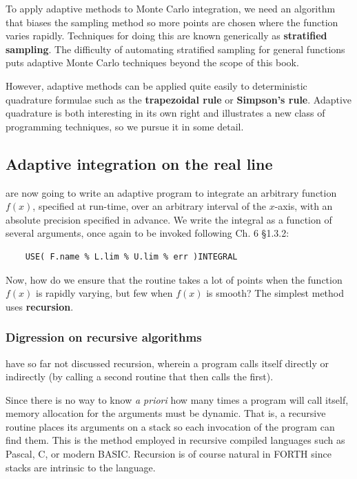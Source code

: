 To apply adaptive methods to Monte Carlo integration, we need an algorithm that biases the sampling method so more points are chosen where the function varies rapidly. Techniques for doing this are known generically as \textbf{stratified sampling}. The difficulty of automating stratified sampling for general functions puts adaptive Monte Carlo techniques beyond the scope of this book.

However, adaptive methods can be applied quite easily to deterministic quadrature formulae such as the \textbf{trapezoidal rule} or \textbf{Simpson’s rule}. Adaptive quadrature is both interesting in its own right and illustrates a new class of programming techniques, so we pursue it in some detail.

\subsection{Adaptive integration on the real line} 
 are now going to write an adaptive program to integrate an arbitrary function $f(x)$, specified at run-time, over an arbitrary interval of the $x$-axis, with an absolute precision specified in advance. We write the integral as a function of several arguments, once again to be invoked following Ch. 6 \S1.3.2:

\begin{lstlisting}
    USE( F.name % L.lim % U.lim % err )INTEGRAL
\end{lstlisting}

Now, how do we ensure that the routine takes a lot of points when the function $f(x)$ is rapidly varying, but few when $f(x)$ is smooth? The simplest method uses \textbf{recursion}.

\subsubsection{Digression on recursive algorithms}
 have so far not discussed recursion, wherein a program calls itself directly or indirectly (by calling a second routine that then calls the first).

Since there is no way to know \textit{a priori} how many times a program will call itself, memory allocation for the arguments must be dynamic. That is, a recursive routine places its arguments on a stack so each invocation of the program can find them. This is the method employed in recursive compiled languages such as Pascal, C, or modern BASIC. Recursion is of course natural in FORTH since stacks are intrinsic to the language.

